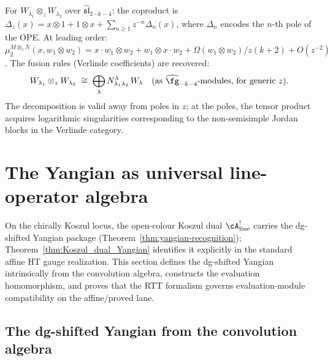 \begin{computation}
For $W_{\lambda_1}\otimes_z W_{\lambda_2}$ over
$\widehat{\mathfrak{sl}}_2{}_{-k-4}$:
the coproduct is
$\Delta_z(x)=x\otimes 1+1\otimes x
+\sum_{n\ge 1}z^{-n}\Delta_n(x)$,
where $\Delta_n$ encodes the $n$-th pole of the OPE.
At leading order: $\mu_2^{M\otimes_z N}(x,w_1\otimes w_2)
=x\cdot w_1\otimes w_2+w_1\otimes x\cdot w_2
+\Omega(w_1\otimes w_2)/z(k{+}2)+O(z^{-2})$.
The fusion rules (Verlinde coefficients) are recovered:
\[
W_{\lambda_1}\otimes_z W_{\lambda_2}
\;\cong\;
\bigoplus_\lambda
N^{\lambda}_{\lambda_1\lambda_2}\,W_\lambda
\quad
\text{(as $\widehat{\fg}_{-k-4}$-modules, for generic $z$)}.
\]
The decomposition is valid away from poles in $z$; at the
poles, the tensor product acquires logarithmic singularities
corresponding to the non-semisimple Jordan blocks in the
Verlinde category.
\end{computation}


\section{The Yangian as universal line-operator algebra}

On the chirally Koszul locus, the open-colour Koszul dual
$\cA^!_{\mathrm{line}}$ carries the dg-shifted Yangian package
(Theorem~\ref{thm:yangian-recognition}); Theorem~\ref{thm:Koszul_dual_Yangian}
identifies it explicitly in the standard affine HT
gauge realization. This section defines the
dg-shifted Yangian intrinsically from the convolution algebra,
constructs the evaluation homomorphism, and proves that the RTT
formalism governs evaluation-module compatibility on the
affine/proved lane.

\subsection{The dg-shifted Yangian from the convolution algebra}


